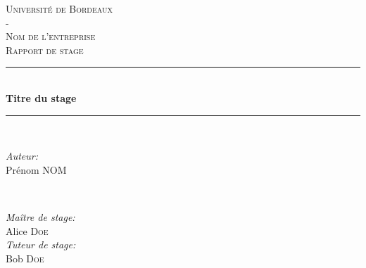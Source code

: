 \documentclass[a4paper]{article}
\begin{document}
\def\labelitemi{--}

\begin{titlepage}

    \newcommand{\HRule}{\rule{\linewidth}{0.5mm}} %
    \center

    \textsc{\LARGE Université de Bordeaux}\\[0.5cm]
    \textsc{\LARGE -}\\[0.5cm]
    \textsc{\Large Nom de l'entreprise}\\[0.5cm]
    \textsc{\large Rapport de stage}\\[1cm]


    \HRule \\[0.4cm]
    { \huge \bfseries Titre du stage}\\[0.4cm]
    \HRule \\[2cm]


    \begin{minipage}{0.4\textwidth}
        \begin{flushleft} \large
            \emph{Auteur:}\\
            Prénom \textsc{NOM}
        \end{flushleft}
    \end{minipage}
    ~
    \begin{minipage}{0.4\textwidth}
        \begin{flushright} \large
            \emph{Maître de stage:} \\
            Alice \textsc{Doe}\\[1cm]

            \emph{Tuteur de stage:}\\
            Bob \textsc{Doe}\\

        \end{flushright}
    \end{minipage}\\[2cm]



\end{titlepage}
\end{document}
